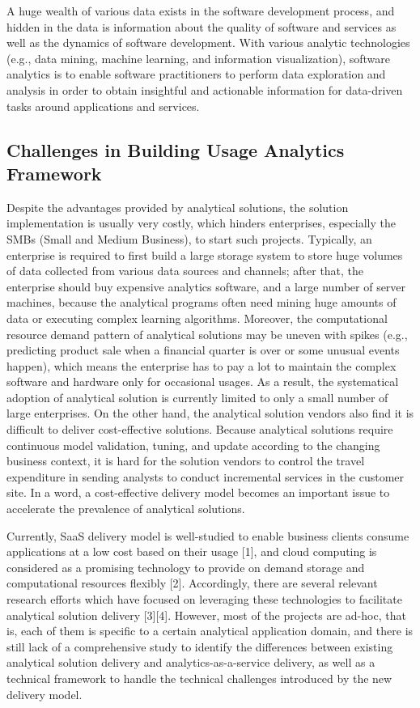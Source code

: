A huge wealth of various data exists in the software development process, and hidden in the data is information about the quality of software and services as well as the dynamics of software development. With various analytic technologies (e.g., data mining, machine learning, and information visualization), software analytics is to enable software practitioners to perform data exploration and analysis in order to obtain insightful and actionable information for data-driven tasks around applications and services.

\subsection{Challenges in Building Usage Analytics Framework}

Despite the advantages provided by analytical solutions, the solution implementation is usually very costly, which hinders enterprises, especially the SMBs (Small and Medium Business), to start such projects. Typically, an enterprise is required to first build a large storage system to store huge volumes of data collected from various data sources and channels; after that, the enterprise should buy expensive analytics software, and a large number of server machines, because the analytical programs often need mining huge amounts of data or executing complex learning algorithms. Moreover, the computational resource demand pattern of analytical solutions may be uneven with spikes (e.g., predicting product sale when a financial quarter is over or some unusual events happen), which means the enterprise has to pay a lot to maintain the complex software and hardware only for occasional usages. As a result, the systematical adoption of analytical solution is currently limited to only a small number of large enterprises. On the other hand, the analytical solution vendors also find it is difficult to deliver cost-effective solutions. Because analytical solutions require continuous model validation, tuning, and update according to the changing business context, it is hard for the solution vendors to control the travel expenditure in sending analysts to conduct incremental services in the customer site. In a word, a cost-effective delivery model becomes an important issue to accelerate the prevalence of analytical solutions. 

Currently, SaaS delivery model is well-studied to enable business clients consume applications at a low cost based on their usage [1], and cloud computing is considered as a promising technology to provide on demand storage and computational resources flexibly [2]. Accordingly, there are several relevant research efforts which have focused on leveraging these technologies to facilitate analytical solution delivery [3][4]. However, most of the projects are ad-hoc, that is, each of them is specific to a certain analytical application domain, and there is still lack of a comprehensive study to identify the differences between existing analytical solution delivery and analytics-as-a-service delivery, as well as a technical framework to handle the technical challenges introduced by the new delivery model.

